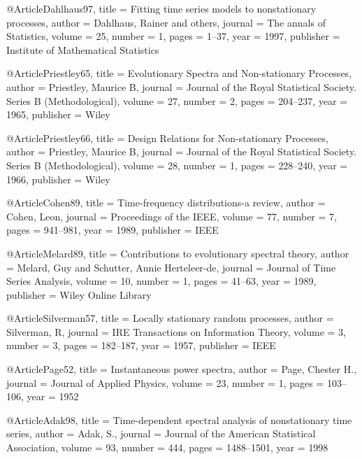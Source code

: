 @Article{Dahlhaus97,
    title   = {Fitting time series models to nonstationary processes},
    author  = {Dahlhaus, Rainer and others},
    journal = {The annals of Statistics},
    volume  = {25},
    number  = {1},
    pages   = {1--37},
    year    = {1997},
    publisher = {Institute of Mathematical Statistics}
}


@Article{Priestley65,
    title   = {Evolutionary {S}pectra and {N}on-stationary {P}rocesses},
    author  = {Priestley, Maurice B},
    journal = {Journal of the Royal Statistical Society. Series B (Methodological)},
    volume  = {27},
    number  = {2},
    pages   = {204--237},
    year    = {1965},
    publisher = {Wiley}
}

@Article{Priestley66,
    title   = {Design {R}elations for {N}on-stationary {P}rocesses},
    author  = {Priestley, Maurice B},
    journal = {Journal of the {R}oyal {S}tatistical {S}ociety. {S}eries {B} ({M}ethodological)},
    volume  = {28},
    number  = {1},
    pages   = {228--240},
    year    = {1966},
    publisher = {Wiley}
}


@Article{Cohen89,
    title     = {Time-frequency distributions-a review},
    author    = {Cohen, Leon},
    journal   = {Proceedings of the IEEE},
    volume    = {77},
    number    = {7},
    pages     = {941--981},
    year      = {1989},
    publisher = {IEEE}
}

@Article{Melard89,
    title     = {Contributions to evolutionary spectral theory},
    author    = {Melard, Guy 
                 and Schutter, Annie Herteleer-de},
    journal   = {Journal of Time Series Analysis},
    volume    = {10},
    number    = {1},
    pages     = {41--63},
    year      = {1989},
    publisher = {Wiley Online Library}
}

@Article{Silverman57,
    title     = {Locally stationary random processes},
    author    = {Silverman, R},
    journal   = {IRE Transactions on Information Theory},
    volume    = {3},
    number    = {3},
    pages     = {182--187},
    year      = {1957},
    publisher = {IEEE}
}

@Article{Page52,
    title   = {Instantaneous power spectra},
    author  = {Page, Chester H.},
    journal = {Journal of Applied Physics},
    volume  = {23},
    number  = {1},
    pages   = {103--106},
    year    = {1952}
}

@Article{Adak98,
  title   = {Time-dependent spectral analysis of nonstationary time series},
  author  = {Adak, S.},
  journal = {Journal of the American Statistical Association},
  volume  = {93},
  number  = {444},
  pages   = {1488--1501},
  year    = {1998}
}

